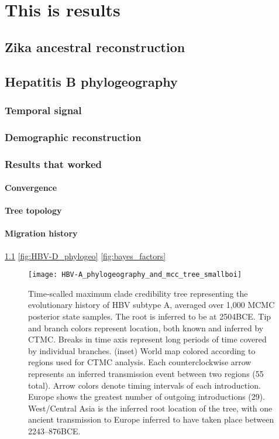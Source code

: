 \chapter{This is results}\label{ch:results}

\section{Zika ancestral reconstruction}

\section{Hepatitis B phylogeography}

\subsection{Temporal signal}

\subsection{Demographic reconstruction}

\subsection{Results that worked}

\subsubsection{Convergence}

\subsubsection{Tree topology}

\subsubsection{Migration history}

\ref{fig:HBV-A_phylogeo}
\ref{fig:HBV-D_phylogeo}
\ref{fig:bayes_factors}

\begin{figure}[ht]
  \centering
  \medskip
  \texttt{[image: HBV-A\_phylogeography\_and\_mcc\_tree\_smallboi]}
  \caption[HBV-A phylogeography ]{Time-scalled maximum clade credibility tree representing the evolutionary history of HBV subtype A, averaged over 1,000 MCMC posterior state samples. The root is inferred to be at 2504BCE. Tip and branch colors represent location, both known and inferred by CTMC. Breaks in time axis represent long periods of time covered by individual branches. (inset) World map colored according to regions used for CTMC analysis. Each counterclockwise arrow represents an inferred transmission event between two regions (55 total). Arrow colors denote timing intervals of each introduction. Europe shows the greatest number of outgoing introductions (29). West/Central Asia is the inferred root location of the tree, with one ancient transmission to Europe inferred to have taken place between 2243--876BCE.}
  \label{fig:HBV-A_phylogeo}
\end{figure}

